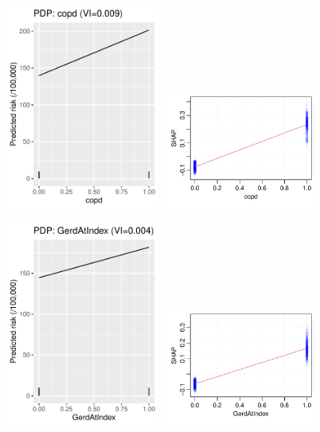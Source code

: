 \documentclass[12pt]{article}
\begin{document}
\begin{figure}[h]
\centering
\includegraphics[width=0.45\textwidth]{figures/pdp/copd.pdf}
\includegraphics[width=0.45\textwidth]{figures/shap/copd.pdf}
\end{figure}
\begin{figure}[h]
\centering
\includegraphics[width=0.45\textwidth]{figures/pdp/GerdAtIndex.pdf}
\includegraphics[width=0.45\textwidth]{figures/shap/GerdAtIndex.pdf}
\end{figure}
\end{document}
